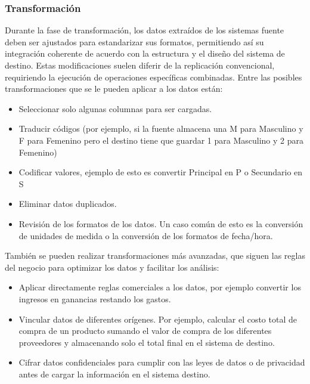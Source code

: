 \subsubsection{Transformaci\'on}

Durante la fase de transformación, los datos extraídos de los sistemas fuente deben ser ajustados para estandarizar sus formatos, 
permitiendo así su integración coherente de acuerdo con la estructura y el diseño del sistema de destino. Estas modificaciones 
suelen diferir de la replicación convencional, requiriendo la ejecución de operaciones específicas combinadas. Entre las 
posibles transformaciones que se le pueden aplicar a los datos est\'an:

\begin{itemize}
    \item Seleccionar solo algunas columnas para ser cargadas.
    \item Traducir c\'odigos (por ejemplo, si la fuente almacena una M para Masculino y F para Femenino pero el destino 
        tiene que guardar 1 para Masculino y 2 para Femenino)
    \item Codificar valores, ejemplo de esto es convertir Principal en P o Secundario en S
    \item Eliminar datos duplicados.
    \item Revisi\'on de los formatos de los datos. Un caso com\'un de esto es la conversi\'on de unidades de medida 
        o la conversi\'on de los formatos de fecha/hora.
\end{itemize}

También se pueden realizar transformaciones m\'as avanzadas, que siguen las reglas del negocio para optimizar los datos y 
facilitar los análisis:

\begin{itemize}
    \item Aplicar directamente reglas comerciales a los datos, por ejemplo convertir los ingresos en ganancias restando los 
        gastos.
    \item Vincular datos de diferentes or\'igenes. Por ejemplo, calcular el costo total de compra de un producto 
        sumando el valor de compra de los diferentes proveedores y almacenando solo el total final en el sistema de destino.
    \item Cifrar datos confidenciales para cumplir con las leyes de datos o de privacidad antes de cargar la informaci\'on 
        en el sistema destino.
\end{itemize}


